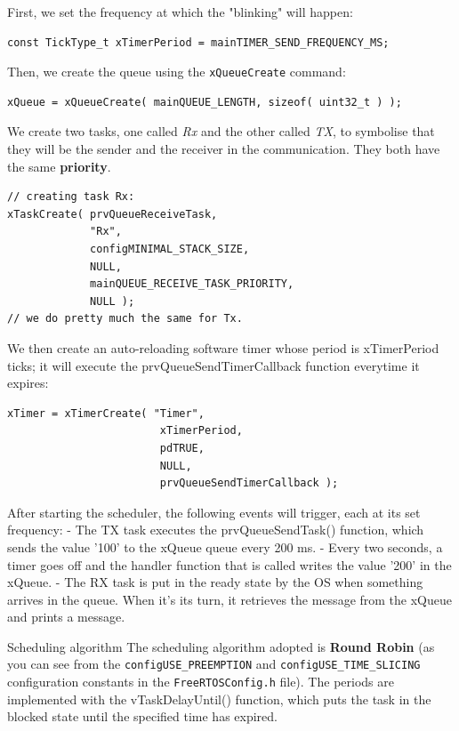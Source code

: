 \documentclass[10pt]{article}
\begin{document}
First, we set the frequency at which the "blinking" will happen:

\begin{lstlisting}
const TickType_t xTimerPeriod = mainTIMER_SEND_FREQUENCY_MS;
\end{lstlisting}

Then, we create the queue using the \verb|xQueueCreate| command:
\begin{lstlisting}
xQueue = xQueueCreate( mainQUEUE_LENGTH, sizeof( uint32_t ) );
\end{lstlisting}

We create two tasks, one called \textit{Rx} and the other called \textit{TX}, to symbolise that they will be the sender and the receiver in the communication. They both have the same \textbf{priority}.
\begin{lstlisting}
// creating task Rx:
xTaskCreate( prvQueueReceiveTask,
             "Rx",
             configMINIMAL_STACK_SIZE,        
             NULL,                           
             mainQUEUE_RECEIVE_TASK_PRIORITY,
             NULL );
// we do pretty much the same for Tx.                      
\end{lstlisting}
We then create an auto-reloading software timer whose period is xTimerPeriod ticks; it will execute the prvQueueSendTimerCallback function everytime it expires:
\begin{lstlisting}
xTimer = xTimerCreate( "Timer",
                        xTimerPeriod,
                        pdTRUE,
                        NULL,
                        prvQueueSendTimerCallback );
\end{lstlisting}
After starting the scheduler, the following events will trigger, each at its set frequency:
- The TX task executes the prvQueueSendTask() function, which sends the value '100' to the xQueue queue every 200 ms.
- Every two seconds, a timer goes off and the handler function that is called writes the value '200' in the xQueue.
- The RX task is put in the ready state by the OS when something arrives in the queue. When it's its turn, it retrieves the message from the xQueue and prints a message.
 
\begin{example}{Scheduling algorithm}
The scheduling algorithm adopted is \textbf{Round Robin} (as you can see from the \verb|configUSE_PREEMPTION| and \verb|configUSE_TIME_SLICING| configuration constants in the \verb|FreeRTOSConfig.h| file). The periods are implemented with the vTaskDelayUntil() function, which puts the task in the blocked state until the specified time has expired.
\end{example}
\end{document}
